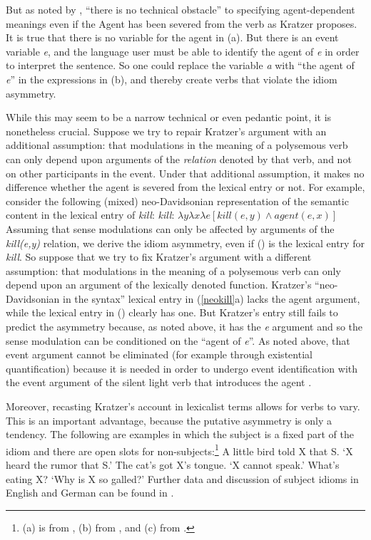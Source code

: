 But as noted by \citet{Wechsler2005a}, ``there is no technical obstacle'' to specifying
agent-dependent meanings even if the Agent has been severed from the verb as Kratzer proposes.  It
is true that there is no variable for the agent in (a).  But there is an event variable
\emph{e}, and the language user must be able to identify the agent of \emph{e} in order to interpret
the sentence.  So one could replace the variable \emph{a} with ``the agent of \emph{e}'' in the
expressions in (b), and thereby create verbs that violate the idiom asymmetry.

While this may seem to be a narrow technical or even pedantic point, it is nonetheless crucial.  Suppose we try to repair Kratzer's argument with an additional assumption: that modulations in the meaning of a polysemous verb can only depend upon arguments of the \emph{relation} denoted by that verb, and not on other participants in the event.  Under that additional assumption, it makes no difference whether the agent is severed from the lexical entry or not.   For example, consider the following (mixed) neo-Davidsonian representation of the semantic content in the lexical entry of \emph{kill}:    
\ea 
\emph{kill}: $\lambda y\lambda x\lambda e[kill(e,y) \wedge agent(e, x)]$ 
\z
\addlines
Assuming that sense modulations can only be affected by arguments of the \emph{kill(e,y)} relation,
we derive the idiom asymmetry, even if () is the lexical entry for \emph{kill}.  So suppose
that we try to fix Kratzer's argument with a different assumption: that modulations in the meaning
of a polysemous verb can only depend upon an argument of the lexically denoted function.  Kratzer's
``neo-Davidsonian in the syntax'' lexical entry in (\ref{neokill}a) lacks the agent argument, while
the lexical entry in () clearly has one.  But Kratzer's entry still fails to predict the
asymmetry because, as noted above, it has the \emph{e} argument and so the sense modulation can be
conditioned on the ``agent of \emph{e}''.  As noted above, that event argument cannot be eliminated
(for example through existential quantification) because it is needed in order to undergo event
identification with the event argument of the silent light verb that introduces the agent
\citep[]{Kratzer96a}.

Moreover, recasting Kratzer's account in lexicalist terms allows for verbs to vary.  This is an
important advantage, because the putative asymmetry is only a tendency.  The following are examples
in which the subject is a fixed part of the idiom and there are open slots for
non-subjects:\footnote{
(a) is from , (b) from , and
  (c) from .%
}
\eal
\ex\label{bird}
 A little bird told X that S.
\glt `X heard the rumor that S.'
\ex\label{cat-tounge}
The cat's got X's tongue.
\glt `X cannot speak.'   
\ex\label{what-is-eating-x}
What's eating X?
\glt `Why is X so galled?'
\zl
Further data and discussion of subject idioms in English and German can be found in .

